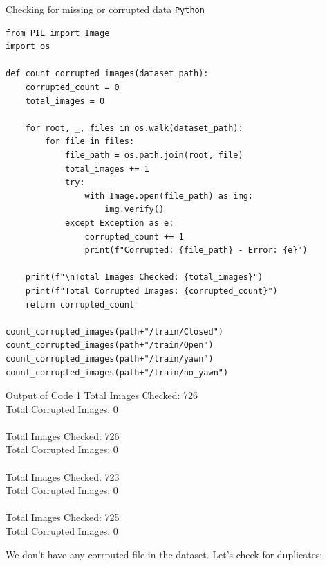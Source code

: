\documentclass{modeleRapport}
\begin{document}
\begin{codebox}{Checking for missing or corrupted data \texttt{Python}}
\begin{lstlisting}
from PIL import Image
import os

def count_corrupted_images(dataset_path):
    corrupted_count = 0
    total_images = 0

    for root, _, files in os.walk(dataset_path):
        for file in files:
            file_path = os.path.join(root, file)
            total_images += 1
            try:
                with Image.open(file_path) as img:
                    img.verify()
            except Exception as e:
                corrupted_count += 1
                print(f"Corrupted: {file_path} - Error: {e}")

    print(f"\nTotal Images Checked: {total_images}")
    print(f"Total Corrupted Images: {corrupted_count}")
    return corrupted_count

count_corrupted_images(path+"/train/Closed")
count_corrupted_images(path+"/train/Open")
count_corrupted_images(path+"/train/yawn")
count_corrupted_images(path+"/train/no_yawn")
\end{lstlisting}
\end{codebox}

\begin{codebox}[OutputA]{ Output of Code 1}
Total Images Checked: 726\\
Total Corrupted Images: 0\\
\\
Total Images Checked: 726\\
Total Corrupted Images: 0\\
\\
Total Images Checked: 723\\
Total Corrupted Images: 0\\
\\
Total Images Checked: 725\\
Total Corrupted Images: 0\\
\end{codebox}

We don't have any corrputed file in the dataset. Let's check for duplicates:
\end{document}
